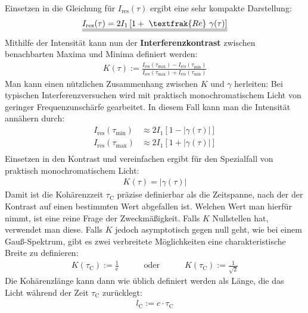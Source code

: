 \documentclass[german,  %
parskip=full,  %
]{scrartcl}
\begin{document}
Einsetzen in die Gleichung für \(I_{\mathrm{res}}(\tau)\) ergibt eine sehr kompakte Darstellung:
\begin{align}
\underline{\underline{I_{\mathrm{res}}(\tau) = 2I_1 \left[ 1 +  \ \textfrak{Re} \ \gamma(\tau)\right]}}
\end{align}
Mithilfe der Intensität kann nun der \textbf{Interferenzkontrast} zwischen benachbarten Maxima und Minima definiert werden:
\begin{align}
K(\tau) := \frac{I_{\mathrm{res}}(\tau_{\mathrm{max}}) - I_{\mathrm{res}}(\tau_{\mathrm{min}}) }{I_{\mathrm{res}}(\tau_{\mathrm{max}}) + I_{\mathrm{res}}(\tau_{\mathrm{min}}) }
\end{align}
Man kann einen nützlichen Zusammenhang zwischen \(K\) und \(\gamma\) herleiten: Bei typischen Interferenzversuchen wird mit praktisch monochromatischem Licht von geringer Frequenzunschärfe gearbeitet. In diesem Fall kann man die Intensität annähern durch:
\begin{align*}
I_{\mathrm{res}}(\tau_{\mathrm{min}}) &\approx 2I_1 \left[ 1 -  |\gamma(\tau)|\right] \\
I_{\mathrm{res}}(\tau_{\mathrm{max}}) &\approx 2I_1 \left[ 1 +  |\gamma(\tau)|\right] \\
\end{align*}
Einsetzen in den Kontrast und vereinfachen ergibt für den Spezialfall von praktisch monochromatischem Licht:
\begin{align}
K(\tau) = |\gamma(\tau)|
\end{align}
Damit ist die Kohärenzzeit \(\tau_{\mathrm{C}}\) präzise definierbar als die Zeitspanne, nach der der Kontrast auf einen bestimmten Wert abgefallen ist. Welchen Wert man hierfür nimmt, ist eine reine Frage der Zweckmäßigkeit. Falls \(K\) Nullstellen hat, verwendet man diese. Falls \(K\) jedoch asymptotisch gegen null geht, wie bei einem Gauß-Spektrum, gibt es zwei verbreitete Möglichkeiten eine charakteristische Breite zu definieren:
\begin{align}
K(\tau_{\mathrm{C}}) := \frac{1}{\mathrm{e}} \quad\quad\quad\text{oder} \quad\quad\quad K(\tau_{\mathrm{C}}) := \frac{1}{\sqrt{2}}
\end{align}
Die Kohärenzlänge kann dann wie üblich definiert werden als Länge, die das Licht während der Zeit \(\tau_{\mathrm{C}}\) zurücklegt:
\begin{align}
l_{\mathrm{C}} := c\cdot\tau_{\mathrm{C}}
\end{align}
\end{document}
